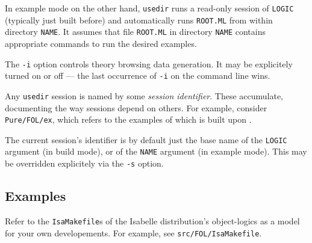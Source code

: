 In example mode on the other hand, \texttt{usedir} runs a read-only
session of \texttt{LOGIC} (typically just built before) and
automatically runs \texttt{ROOT.ML} from within directory
\texttt{NAME}.  It assumes that file \texttt{ROOT.ML} in directory
\texttt{NAME} contains appropriate {\ML} commands to run the desired
examples.

\medskip The \texttt{-i} option controls theory browsing data
generation. It may be explicitely turned on or off --- the last
occurrence of \texttt{-i} on the command line wins.

\medskip Any \texttt{usedir} session is named by some \emph{session
  identifier}. These accumulate, documenting the way sessions depend
on others. For example, consider \texttt{Pure/FOL/ex}, which refers to
the examples of {\FOL} which is built upon {\Pure}.

The current session's identifier is by default just the base name of
the \texttt{LOGIC} argument (in build mode), or of the \texttt{NAME}
argument (in example mode). This may be overridden explicitely via the
\texttt{-s} option.


\subsection*{Examples}

Refer to the \texttt{IsaMakefile}s of the Isabelle distribution's
object-logics as a model for your own developements.  For example, see
\texttt{src/FOL/IsaMakefile}.


